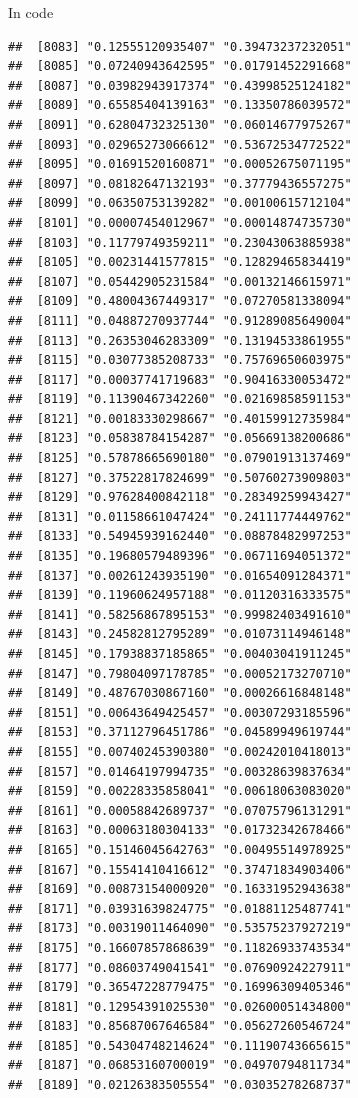 \documentclass[ignorenonframetext,]{beamer}
\begin{document}
\begin{frame}[fragile]{In code}
\begin{verbatim}
##  [8083] "0.12555120935407" "0.39473237232051"
##  [8085] "0.07240943642595" "0.01791452291668"
##  [8087] "0.03982943917374" "0.43998525124182"
##  [8089] "0.65585404139163" "0.13350786039572"
##  [8091] "0.62804732325130" "0.06014677975267"
##  [8093] "0.02965273066612" "0.53672534772522"
##  [8095] "0.01691520160871" "0.00052675071195"
##  [8097] "0.08182647132193" "0.37779436557275"
##  [8099] "0.06350753139282" "0.00100615712104"
##  [8101] "0.00007454012967" "0.00014874735730"
##  [8103] "0.11779749359211" "0.23043063885938"
##  [8105] "0.00231441577815" "0.12829465834419"
##  [8107] "0.05442905231584" "0.00132146615971"
##  [8109] "0.48004367449317" "0.07270581338094"
##  [8111] "0.04887270937744" "0.91289085649004"
##  [8113] "0.26353046283309" "0.13194533861955"
##  [8115] "0.03077385208733" "0.75769650603975"
##  [8117] "0.00037741719683" "0.90416330053472"
##  [8119] "0.11390467342260" "0.02169858591153"
##  [8121] "0.00183330298667" "0.40159912735984"
##  [8123] "0.05838784154287" "0.05669138200686"
##  [8125] "0.57878665690180" "0.07901913137469"
##  [8127] "0.37522817824699" "0.50760273909803"
##  [8129] "0.97628400842118" "0.28349259943427"
##  [8131] "0.01158661047424" "0.24111774449762"
##  [8133] "0.54945939162440" "0.08878482997253"
##  [8135] "0.19680579489396" "0.06711694051372"
##  [8137] "0.00261243935190" "0.01654091284371"
##  [8139] "0.11960624957188" "0.01120316333575"
##  [8141] "0.58256867895153" "0.99982403491610"
##  [8143] "0.24582812795289" "0.01073114946148"
##  [8145] "0.17938837185865" "0.00403041911245"
##  [8147] "0.79804097178785" "0.00052173270710"
##  [8149] "0.48767030867160" "0.00026616848148"
##  [8151] "0.00643649425457" "0.00307293185596"
##  [8153] "0.37112796451786" "0.04589949619744"
##  [8155] "0.00740245390380" "0.00242010418013"
##  [8157] "0.01464197994735" "0.00328639837634"
##  [8159] "0.00228335858041" "0.00618063083020"
##  [8161] "0.00058842689737" "0.07075796131291"
##  [8163] "0.00063180304133" "0.01732342678466"
##  [8165] "0.15146045642763" "0.00495514978925"
##  [8167] "0.15541410416612" "0.37471834903406"
##  [8169] "0.00873154000920" "0.16331952943638"
##  [8171] "0.03931639824775" "0.01881125487741"
##  [8173] "0.00319011464090" "0.53575237927219"
##  [8175] "0.16607857868639" "0.11826933743534"
##  [8177] "0.08603749041541" "0.07690924227911"
##  [8179] "0.36547228779475" "0.16996309405346"
##  [8181] "0.12954391025530" "0.02600051434800"
##  [8183] "0.85687067646584" "0.05627260546724"
##  [8185] "0.54304748214624" "0.11190743665615"
##  [8187] "0.06853160700019" "0.04970794811734"
##  [8189] "0.02126383505554" "0.03035278268737"

\end{verbatim}
\end{frame}
\end{document}
